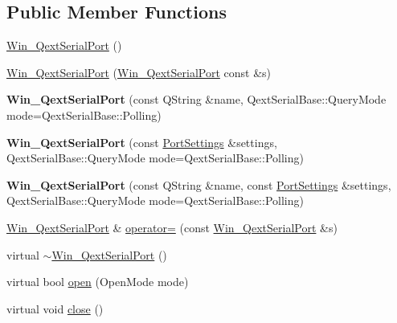 \subsection*{Public Member Functions}
\begin{DoxyCompactItemize}
\item 
\mbox{\hyperlink{class_win___qext_serial_port_a3f96ad148dd04e48d2251d85866f2bb7}{Win\+\_\+\+Qext\+Serial\+Port}} ()
\item 
\mbox{\hyperlink{class_win___qext_serial_port_aa2968038a33b91c0f21e43f2a267a35c}{Win\+\_\+\+Qext\+Serial\+Port}} (\mbox{\hyperlink{class_win___qext_serial_port}{Win\+\_\+\+Qext\+Serial\+Port}} const \&s)
\item 
\mbox{\label{class_win___qext_serial_port_aecb3e9c31c2156b9cc40de40a1603da4}} 
{\bfseries Win\+\_\+\+Qext\+Serial\+Port} (const Q\+String \&name, Qext\+Serial\+Base\+::\+Query\+Mode mode=Qext\+Serial\+Base\+::\+Polling)
\item 
\mbox{\label{class_win___qext_serial_port_a3680b356503229374962e1fc7e7d7d74}} 
{\bfseries Win\+\_\+\+Qext\+Serial\+Port} (const \mbox{\hyperlink{struct_port_settings}{Port\+Settings}} \&settings, Qext\+Serial\+Base\+::\+Query\+Mode mode=Qext\+Serial\+Base\+::\+Polling)
\item 
\mbox{\label{class_win___qext_serial_port_a94cda3ec4eade1a810ae3250e2f445b8}} 
{\bfseries Win\+\_\+\+Qext\+Serial\+Port} (const Q\+String \&name, const \mbox{\hyperlink{struct_port_settings}{Port\+Settings}} \&settings, Qext\+Serial\+Base\+::\+Query\+Mode mode=Qext\+Serial\+Base\+::\+Polling)
\item 
\mbox{\hyperlink{class_win___qext_serial_port}{Win\+\_\+\+Qext\+Serial\+Port}} \& \mbox{\hyperlink{class_win___qext_serial_port_a94d64c3eae955a98eea5fc583f850d87}{operator=}} (const \mbox{\hyperlink{class_win___qext_serial_port}{Win\+\_\+\+Qext\+Serial\+Port}} \&s)
\item 
virtual \mbox{\hyperlink{class_win___qext_serial_port_a6700be65cee973991ccf77a6afdf131a}{$\sim$\+Win\+\_\+\+Qext\+Serial\+Port}} ()
\item 
virtual bool \mbox{\hyperlink{class_win___qext_serial_port_a80fa78e5c369199a1bf37b37786e9b05}{open}} (Open\+Mode mode)
\item 
virtual void \mbox{\hyperlink{class_win___qext_serial_port_afd2a4f6a94c877e5ae2dbf742af61b1d}{close}} ()

\end{DoxyCompactItemize}
